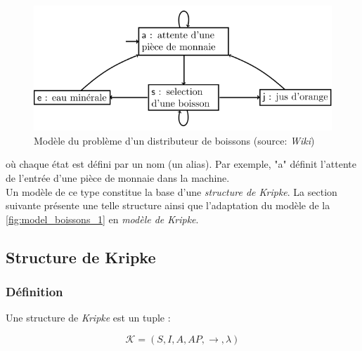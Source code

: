 \documentclass[runningheads,a4paper,10pt]{llncs}
\begin{document}
\begin{figure}
  \centering
   \includegraphics[scale=0.4]{figures/model-boissons.png}
   \caption[Caption for LOF]{Modèle du problème d'un distributeur de boissons (source: \textit{Wiki})\protect\footnotemark}
   \label{fig:model_boissons_1}
\end{figure}


\noindent
où chaque état est défini par un nom (un alias). Par exemple, "a" définit l'attente de l'entrée d'une pièce de monnaie dans la machine. \\

Un modèle de ce type constitue la base d'une \textit{structure de Kripke}. La section suivante présente une telle structure ainsi que l'adaptation du modèle de la \autoref{fig:model_boissons_1} en \textit{modèle de Kripke}. 

\subsection{Structure de Kripke} \label{sec:kripke}

\subsubsection{Définition} 

Une structure de \textit{Kripke} \cite{Kripke} est un tuple : 

$$\boxed{\mathcal{K} = (S,I,A,AP,\longrightarrow,\lambda)}$$ 
\end{document}
